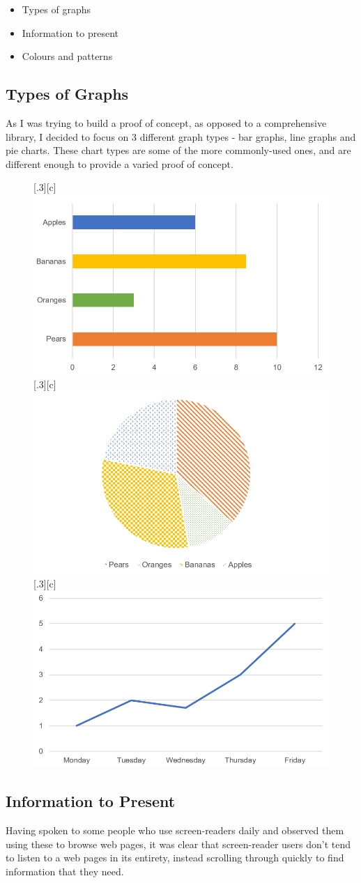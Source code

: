 \documentclass[ %
                    author={Aleena Baig},
                supervisor={Dr Simon Lock},
                    degree={BSc},
                     title={On Making Web Accessible Graphs},
                  subtitle={},
                      year={2019} ]{dissertation}
\begin{document}
\begin{itemize}
    \item Types of graphs
    \item Information to present
    \item Colours and patterns
\end{itemize}

\subsection{Types of Graphs}

As I was trying to build a proof of concept, as opposed to a comprehensive library, I decided to focus on 3 different graph types - bar graphs, line graphs and pie charts. These chart types are some of the more commonly-used ones, and are different enough to provide a varied proof of concept.
\newline
\begin{figure}[H]
  \centering
  [.3\linewidth][c]{%
    \includegraphics[width=.3\linewidth]{images/BarGraph.PNG}}\quad
  [.3\linewidth][c]{%
    \includegraphics[width=.3\linewidth]{images/PieGraph.PNG}}\quad
  [.3\linewidth][c]{%
    \includegraphics[width=.3\linewidth]{images/LineGraph.PNG}}
\end{figure}

\subsection{Information to Present}

Having spoken to some people who use screen-readers daily and observed them using these to browse web pages, it was clear that screen-reader users don't tend to listen to a web pages in its entirety, instead scrolling through quickly to find information that they need.
\end{document}
